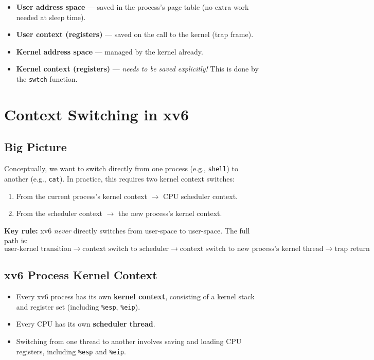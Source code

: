 \documentclass[11pt]{article}
\begin{document}
\begin{itemize}
    \item \textbf{User address space} --- saved in the process's page table (no extra work needed at sleep time).
    \item \textbf{User context (registers)} --- saved on the call to the kernel (trap frame).
    \item \textbf{Kernel address space} --- managed by the kernel already.
    \item \textbf{Kernel context (registers)} --- \emph{needs to be saved explicitly!} This is done by the \texttt{swtch} function.
\end{itemize}

\section{Context Switching in xv6}

\subsection{Big Picture}

Conceptually, we want to switch directly from one process (e.g., \texttt{shell}) to another (e.g., \texttt{cat}). In practice, this requires two kernel context switches:

\begin{enumerate}
    \item From the current process's kernel context $\to$ CPU scheduler context.
    \item From the scheduler context $\to$ the new process's kernel context.
\end{enumerate}

\textbf{Key rule:} xv6 \emph{never} directly switches from user-space to user-space. The full path is:
\[
\text{user-kernel transition} \to \text{context switch to scheduler} \to \text{context switch to new process's kernel thread} \to \text{trap return}
\]

\subsection{xv6 Process Kernel Context}

\begin{itemize}
    \item Every xv6 process has its own \textbf{kernel context}, consisting of a kernel stack and register set (including \texttt{\%esp}, \texttt{\%eip}).
    \item Every CPU has its own \textbf{scheduler thread}.
    \item Switching from one thread to another involves saving and loading CPU registers, including \texttt{\%esp} and \texttt{\%eip}.
\end{itemize}
\end{document}
